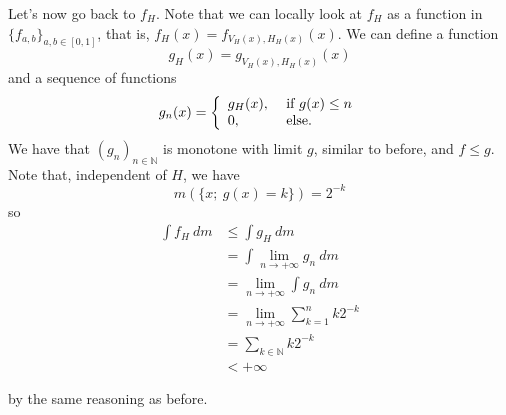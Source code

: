\documentclass[a4paper,12pt,twoside,BCOR=10mm]{scrbook}
\theoremstyle{definition}
\theoremstyle{definition}
\theoremstyle{definition}
\begin{document}
Let's now go back to $f_H$.
Note that we can locally look at $f_H$ as a function in $\{f_{a, b}\}_{a, b \in [0, 1]}$, that is, $f_H(x) = f_{V_H(x), H_H(x)}(x)$.
We can define a function
\[
	g_H(x) = g_{V_H(x), H_H(x)}(x)
\]
and a sequence of functions
\[
	g_n(x) = \left \{
	\begin{array}{l l}
	g_H(x), & \text{ if } g(x) \leq n \\
	0, & \text{ else}.
	\end{array}
	\right .
\]
We have that $(g_n)_{n \in \mathbb{N}}$ is monotone with limit $g$, similar to before, and $f \leq g$.
Note that, independent of $H$, we have
\[
	m(\{x;\ g(x) = k\}) = 2^{-k}
\]
so
\begin{align*}
\int f_H\ dm
&\leq \int g_H\ dm\\
&= \int \lim_{n \rightarrow +\infty} g_n\ dm\\
&= \lim_{n \rightarrow +\infty} \int g_n\ dm\\
&= \lim_{n \rightarrow +\infty} \sum_{k = 1}^n k2^{-k}\\
&= \sum_{k \in \mathbb{N}} k2^{-k}\\
&< +\infty
\end{align*}
\begin{center}
\end{center}
by the same reasoning as before.
\end{document}
